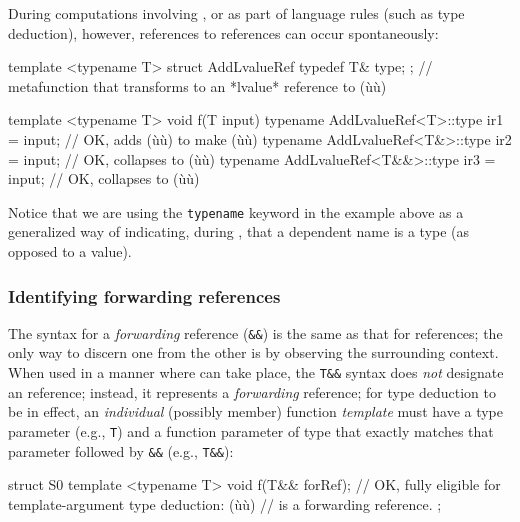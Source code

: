 \noindent During computations involving , or as part of
language rules (such as type deduction), however, references to
references can occur spontaneously:

\begin{emcppslisting}
template <typename T>
struct AddLvalueRef { typedef T& type; };
    // metafunction that transforms to an *lvalue* reference to (ù{}ù)

template <typename T>
void f(T input)
{
    typename AddLvalueRef<T>::type ir1 = input;    // OK, adds (ù{\codeincomments{\&}}ù) to make (ù{}ù)
    typename AddLvalueRef<T&>::type ir2 = input;   // OK, collapses to (ù{}ù)
    typename AddLvalueRef<T&&>::type ir3 = input;  // OK, collapses to (ù{}ù)
}
\end{emcppslisting}

\noindent Notice that we are using the \lstinline!typename! keyword in the example above as a
generalized way of indicating, during ,
that a dependent name is a type (as opposed to a value).

\subsubsection[Identifying forwarding references]{Identifying forwarding references}\label{identifying-forwarding-references}

The syntax for a \emph{forwarding} reference (\lstinline!&&!) is the same
as that for  references; the only way to discern one from
the other is by observing the surrounding context. When used in a manner
where  can take place, the \lstinline!T&&! syntax
does \emph{not} designate an  reference; instead, it
represents a \emph{forwarding} reference; for type deduction to be in
effect, an \emph{individual} (possibly member) function \emph{template}
must have a type parameter (e.g., \lstinline!T!) and a function parameter of
type that exactly matches that parameter followed by \lstinline!&&!
(e.g., \lstinline!T&&!):

\begin{emcppslisting}
struct S0
{
    template <typename T>
    void f(T&& forRef);
        // OK, fully eligible for template-argument type deduction: (ù{}ù)
        // is a forwarding reference.
};
\end{emcppslisting}

